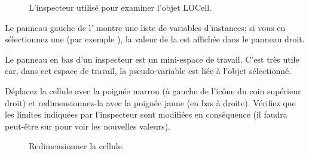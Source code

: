 \documentclass[a4paper,10pt,twoside]{book}
\begin{document}
\begin{figure}[htbp]
   \centering
   \caption{L'inspecteur utilisé pour examiner l'objet LOCell.}
\end{figure}

Le panneau gauche de l' montre une liste de variables
d'instances; si vous en sélectionnez une (par exemple
\mbox{),} la valeur de la  est
affichée dans le panneau droit. %


Le panneau en bas d'un inspecteur est un mini-espace de
travail. C'est très utile car, dans cet espace de travail, la
  pseudo-variable \self{} est liée à l'objet sélectionné.

Déplacez la cellule avec la poignée marron (à 
gauche de l'icône du coin supérieur droit) et redimensionnez-la avec la poignée jaune (en bas à droite).
Vérifiez que les limites indiquées par l'inspecteur sont modifiées en
conséquence (il faudra peut-être \actclick{} sur  pour voir les nouvelles valeurs). %

\begin{figure}[htbp]
\centering
\caption{Redimensionner la cellule.}
\end{figure}
\end{document}
